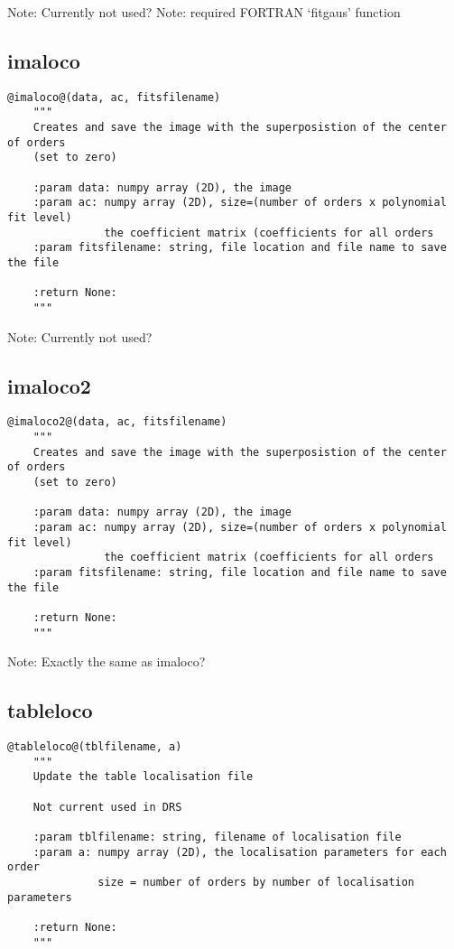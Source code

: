 \noindent Note: Currently not used?
\noindent Note: required FORTRAN `fitgaus' function

\vspace{0.5cm}
\subsection{imaloco}
\begin{lstlisting}[style=pythonstyle]
@imaloco@(data, ac, fitsfilename)
    """
    Creates and save the image with the superposistion of the center of orders
    (set to zero)

    :param data: numpy array (2D), the image
    :param ac: numpy array (2D), size=(number of orders x polynomial fit level)
               the coefficient matrix (coefficients for all orders
    :param fitsfilename: string, file location and file name to save the file
    
    :return None:
    """
\end{lstlisting}

\noindent Note: Currently not used?

\vspace{0.5cm}
\subsection{imaloco2}
\begin{lstlisting}[style=pythonstyle]
@imaloco2@(data, ac, fitsfilename)
    """
    Creates and save the image with the superposistion of the center of orders
    (set to zero)

    :param data: numpy array (2D), the image
    :param ac: numpy array (2D), size=(number of orders x polynomial fit level)
               the coefficient matrix (coefficients for all orders
    :param fitsfilename: string, file location and file name to save the file
    
    :return None:
    """
\end{lstlisting}

\noindent Note: Exactly the same as imaloco?

\vspace{0.5cm}
\subsection{tableloco}
\begin{lstlisting}[style=pythonstyle]
@tableloco@(tblfilename, a)
    """
    Update the table localisation file

    Not current used in DRS

    :param tblfilename: string, filename of localisation file
    :param a: numpy array (2D), the localisation parameters for each order
              size = number of orders by number of localisation parameters

    :return None:
    """
\end{lstlisting}

